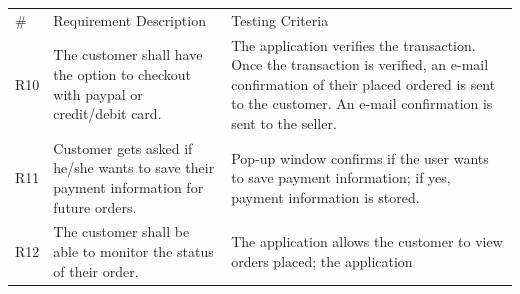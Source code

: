 \documentclass[12pt]{article}
\begin{document}
\begin{myspace}{1.7}
\begin{table}[]
\centering
\label{my-label}
\begin{tabular}{| p{.5cm}|p{9cm} |p{5cm}|}
\#  & Requirement Description                                                                                                                                                                                                                                                                                & Testing Criteria                                                                                                                                                                                                                                                               \\
R10 & The customer shall have the option to checkout with paypal or credit/debit card.                                                                                                                                                                                                                       & The application verifies the transaction. Once the transaction is verified, an e-mail confirmation of their placed ordered is sent to the customer. An e-mail confirmation is sent to the seller.                                                                            \\
R11 & Customer gets asked if he/she wants to save their payment information for future orders.                                                                                                                                                                                                               & Pop-up window confirms if the user wants to save payment information; if yes, payment information is stored.                                                                                                                                                                 \\
R12 & The customer shall be able to monitor the status of their order.                                                                                                                                                                                                                                       & The application allows the customer to view orders placed; the application                                                                                                                                                                                                   \\

\end{tabular}
\end{table}
\end{myspace}
\end{document}
